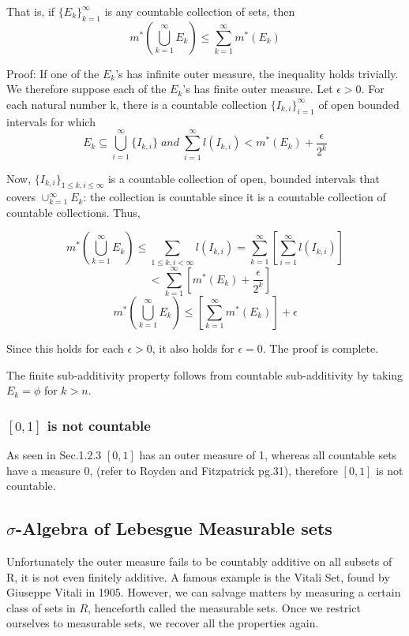 \documentclass{article}
\begin{document}
That is, if $\{E_k\}_{k=1}^{\infty} $ is any countable collection of sets, then
$$ m^*(\bigcup_{k=1}^{\infty} E_k) \leq \sum_{k=1}^{\infty} m^{*}(E_k)$$

Proof: If one of the $E_k$'s has infinite outer measure, the inequality holds trivially. We therefore suppose each of the $E_k$'s has finite outer measure. Let $\epsilon > 0$. For each natural number k, there is a countable collection $\{ I_{k,i} \}_{i=1}^{\infty}$ of open bounded intervals for which
$$ E_k \subseteq \bigcup_{i=1}^{\infty} \{ I_{k,i} \} \; and \; \sum_{i=1}^{\infty} l(I_{k,i}) < m^{*}(E_k) +\frac{\epsilon}{2^k}  $$

Now, $\{I_{k,i}\}_{1 \leq k , i \leq \infty}$ is a countable collection of open, bounded intervals that covers $\cup_{k=1}^{\infty} E_k$: the collection is countable since it is a countable collection of countable collections. Thus,

$$ m^{*}(\bigcup_{k=1}^{\infty} E_k) \leq \sum_{1\leq k,i<\infty } l(I_{k,i})= \sum_{k=1}^{\infty}[\sum_{i=1}^{\infty} l(I_{k,i})]$$
$$\;\;\;<\sum_{k=1}^{\infty}[m^{*}(E_k) + \frac{\epsilon}{2^k}]$$
$$  m^{*}(\bigcup_{k=1}^{\infty} E_k) \leq [\sum_{k=1}^{\infty}m^{*}(E_k)]+\epsilon$$

Since this holds for each $\epsilon>0$, it also holds for $\epsilon=0$. The proof is complete.

The finite sub-additivity property follows from countable sub-additivity by taking $E_k = \phi$ for $k>n$.

\subsubsection{$[0,1]$ is not countable}

As seen in Sec.1.2.3 $[0,1]$ has an outer measure of 1, whereas all countable sets have a measure 0, (refer to Royden and Fitzpatrick pg.31), therefore $[0,1]$ is not countable.


\subsection{$\sigma$-Algebra of Lebesgue Measurable sets}

Unfortunately the outer measure fails to be countably additive on all subsets of R, it is not even finitely additive. A famous example is the Vitali Set, found by Giuseppe Vitali in 1905. However, we can salvage matters by measuring a certain class of sets in $R$, henceforth called the measurable sets. Once we restrict ourselves to measurable sets, we recover all the properties again.
\end{document}
